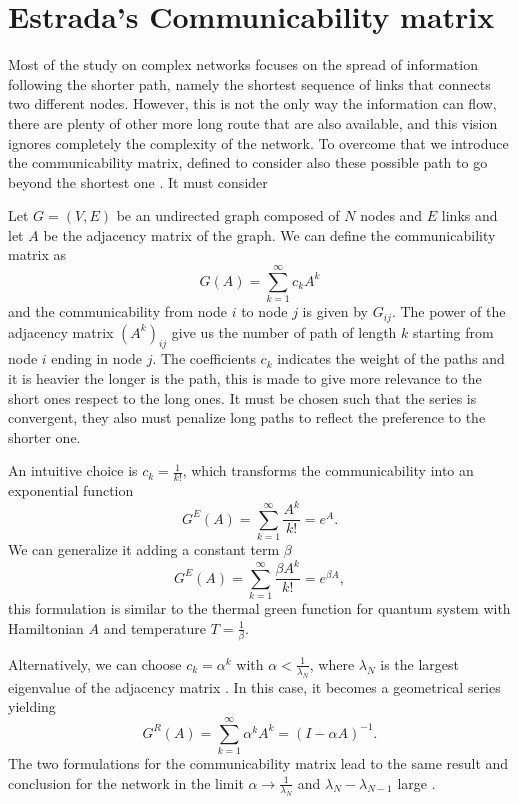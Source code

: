 \section{Estrada's Communicability matrix}

Most of the study on complex networks focuses on the spread of information following the shorter path, namely the shortest sequence of links that connects two different nodes. 
However, this is not the only way the information can flow, there are plenty of other more long route that are also available, and this vision ignores completely the complexity of the network.
To overcome that we introduce the communicability matrix, defined to consider also these possible path to go beyond the shortest one \cite{Estrada_2012}. It must consider 

Let $G=(V,E)$ be an undirected graph composed of $N$ nodes and $E$ links and let $A$ be the adjacency matrix of the graph.
We can define the communicability matrix as
\begin{equation}
    G(A) = \sum_{k=1}^{\infty}c_k A^k
\end{equation}
and the communicability from node $i$ to node $j$ is given by $G_{ij}$. The power of the adjacency matrix $(A^k)_{ij}$ give us the number of path of length $k$ starting from node $i$ ending in node $j$.
The coefficients $c_k$ indicates the weight of the paths and it is heavier the longer is the path, this is made to give more relevance to the short ones respect to the long ones. It must be chosen such that the series is convergent, they also must penalize long paths to reflect the preference to the shorter one.

An intuitive choice is $c_k = \frac{1}{k!}$, which transforms the communicability into an exponential function \cite{Estrada_2008}
\begin{equation}\label{G_E}
    G^E(A) =\sum_{k=1}^{\infty} \frac{A^k}{k!} = e^{A} .
\end{equation}
We can generalize it adding a constant term $\beta$
\begin{equation}\label{G_R}
    G^E(A) =\sum_{k=1}^{\infty} \frac{\beta A^k}{k!} = e^{\beta A} ,
\end{equation}
this formulation is similar to the thermal green function for quantum system with Hamiltonian $A$ and temperature $T = \frac{1}{\beta}$.

Alternatively, we can choose $c_k = \alpha^{k}$ with $\alpha<\frac{1}{\lambda_N}$, where $\lambda_N$ is the largest eigenvalue of the adjacency matrix \cite{Katz}. In this case, it becomes a geometrical series yielding
\begin{equation}
    G^R(A) =\sum_{k=1}^{\infty} \alpha^k A^k = (I -\alpha A)^{-1}.
\end{equation}
The two formulations for the communicability matrix lead to the same result and conclusion for the network in the limit $\alpha \rightarrow \frac{1}{\lambda_N}$ and $\lambda_N -\lambda_{N-1}$ large \cite{Benzi_Klymko}.


